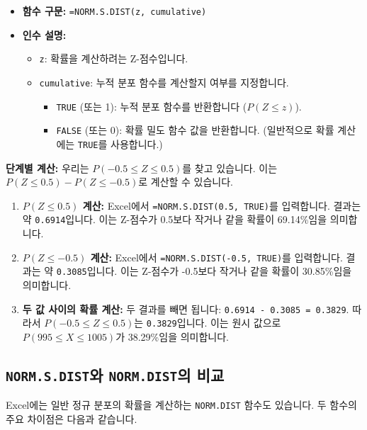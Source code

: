 \documentclass[11pt,a4paper]{article}
\begin{document}
\begin{itemize}
    \item \textbf{함수 구문:} \texttt{=NORM.S.DIST(z, cumulative)}
    \item \textbf{인수 설명:}
    \begin{itemize}
        \item \texttt{z}: 확률을 계산하려는 Z-점수입니다.
        \item \texttt{cumulative}: 누적 분포 함수를 계산할지 여부를 지정합니다.
        \begin{itemize}
            \item \texttt{TRUE} (또는 1): 누적 분포 함수를 반환합니다 ($P(Z \le z)$).
            \item \texttt{FALSE} (또는 0): 확률 밀도 함수 값을 반환합니다. (일반적으로 확률 계산에는 \texttt{TRUE}를 사용합니다.)
        \end{itemize}
    \end{itemize}
\end{itemize}

\begin{examplebox}
    \textbf{단계별 계산:}
    우리는 $P(-0.5 \le Z \le 0.5)$를 찾고 있습니다. 이는 $P(Z \le 0.5) - P(Z \le -0.5)$로 계산할 수 있습니다.

    \begin{enumerate}
        \item \textbf{$P(Z \le 0.5)$ 계산:}
        Excel에서 \texttt{=NORM.S.DIST(0.5, TRUE)}를 입력합니다.
        결과는 약 \texttt{0.6914}입니다.
        이는 Z-점수가 0.5보다 작거나 같을 확률이 69.14\%임을 의미합니다.

        \item \textbf{$P(Z \le -0.5)$ 계산:}
        Excel에서 \texttt{=NORM.S.DIST(-0.5, TRUE)}를 입력합니다.
        결과는 약 \texttt{0.3085}입니다.
        이는 Z-점수가 -0.5보다 작거나 같을 확률이 30.85\%임을 의미합니다.

        \item \textbf{두 값 사이의 확률 계산:}
        두 결과를 빼면 됩니다: \texttt{0.6914 - 0.3085 = 0.3829}.
        따라서 $P(-0.5 \le Z \le 0.5)$는 \texttt{0.3829}입니다.
        이는 원시 값으로 $P(995 \le X \le 1005)$가 38.29\%임을 의미합니다.
    \end{enumerate}
\end{examplebox}

\subsection{\texttt{NORM.S.DIST}와 \texttt{NORM.DIST}의 비교}
Excel에는 일반 정규 분포의 확률을 계산하는 \texttt{NORM.DIST} 함수도 있습니다.
두 함수의 주요 차이점은 다음과 같습니다.
\end{document}

